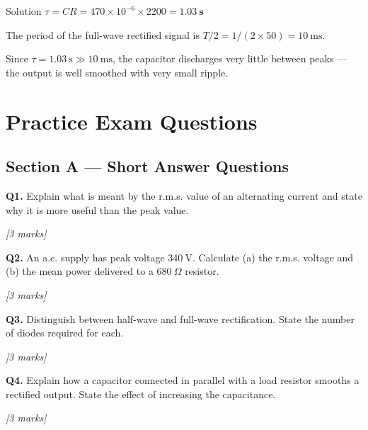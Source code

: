 \begin{examplebox}{Solution}
$\tau = CR = 470\times10^{-6} \times 2200 = \mathbf{1.03\ \text{s}}$

The period of the full-wave rectified signal is $T/2 = 1/(2\times50) = 10\ \text{ms}$.

Since $\tau = 1.03\ \text{s} \gg 10\ \text{ms}$, the capacitor discharges very little between peaks — the output is well smoothed with very small ripple.
\end{examplebox}

\section{Practice Exam Questions}

\subsection*{Section A — Short Answer Questions}

\begin{tcolorbox}[colback=white, colframe=midblue, breakable]

\begin{minipage}{\linewidth}
\textbf{Q1.} Explain what is meant by the r.m.s. value of an alternating current and state why it is more useful than the peak value.
\par\hfill\textit{[3 marks]}
\vspace{3cm}
\end{minipage}

\begin{minipage}{\linewidth}
\textbf{Q2.} An a.c. supply has peak voltage $340\ \text{V}$. Calculate (a) the r.m.s. voltage and (b) the mean power delivered to a $680\ \Omega$ resistor.
\par\hfill\textit{[3 marks]}
\vspace{3cm}
\end{minipage}

\begin{minipage}{\linewidth}
\textbf{Q3.} Distinguish between half-wave and full-wave rectification. State the number of diodes required for each.
\par\hfill\textit{[3 marks]}
\vspace{3cm}
\end{minipage}

\begin{minipage}{\linewidth}
\textbf{Q4.} Explain how a capacitor connected in parallel with a load resistor smooths a rectified output. State the effect of increasing the capacitance.
\par\hfill\textit{[3 marks]}
\vspace{3.5cm}
\end{minipage}

\end{tcolorbox}

